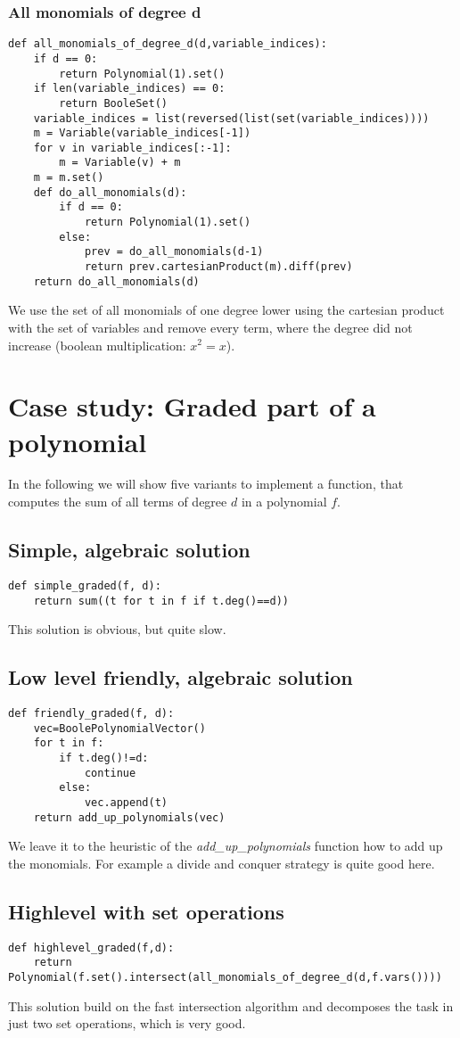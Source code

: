 \documentclass[]{article}
\newcommand{\functionname}[1]{\textit{#1}\xspace}
\begin{document}
\subsubsection{All monomials of degree d}
\begin{verbatim}
def all_monomials_of_degree_d(d,variable_indices):
    if d == 0:
        return Polynomial(1).set()
    if len(variable_indices) == 0:
        return BooleSet()
    variable_indices = list(reversed(list(set(variable_indices))))
    m = Variable(variable_indices[-1])
    for v in variable_indices[:-1]:
        m = Variable(v) + m
    m = m.set()
    def do_all_monomials(d):
        if d == 0:
            return Polynomial(1).set()
        else:
            prev = do_all_monomials(d-1)
            return prev.cartesianProduct(m).diff(prev)
    return do_all_monomials(d)
\end{verbatim}
We use the set of all monomials of one degree lower using the cartesian product with the set of variables and remove every term, where the degree did not increase (boolean multiplication: $x^2=x$).

\section{Case study: Graded part of a polynomial}
In the following we will show five variants to implement a function, that computes the sum of all terms of degree $d$ in a polynomial $f$.
\subsection{Simple, algebraic solution}
\begin{verbatim}
def simple_graded(f, d):
    return sum((t for t in f if t.deg()==d))   
\end{verbatim}
This solution is obvious, but quite slow.
\subsection{Low level friendly, algebraic solution}
\begin{verbatim}
def friendly_graded(f, d):
    vec=BoolePolynomialVector()
    for t in f:
        if t.deg()!=d:
            continue
        else:
            vec.append(t)
    return add_up_polynomials(vec)
\end{verbatim}
We leave it to the heuristic of the \functionname{add\_up\_polynomials} function how to add up the monomials. For example a divide and conquer strategy is quite good here.
\subsection{Highlevel with set operations}
\begin{verbatim}
def highlevel_graded(f,d):
    return Polynomial(f.set().intersect(all_monomials_of_degree_d(d,f.vars())))
\end{verbatim}
This solution build on the fast intersection algorithm and decomposes the task in just two set operations, which is very good.
\end{document}

